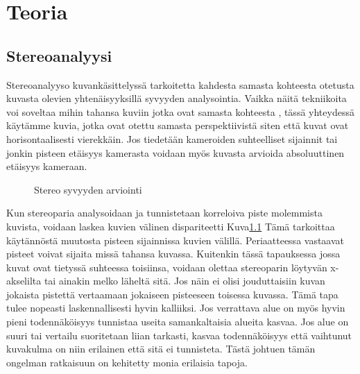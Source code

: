 \chapter{Teoria}%
\label{ch:teoria}

\section{Stereoanalyysi}

Stereoanalyyso kuvankäsittelyssä tarkoitetta kahdesta samasta kohteesta otetusta kuvasta olevien yhtenäisyyksillä syvyyden analysointia.
Vaikka näitä tekniikoita voi soveltaa mihin tahansa kuviin jotka ovat samasta kohteesta \cite{SumiYasushi20023ORi},
tässä yhteydessä käytämme kuvia,
jotka ovat otettu samasta perspektiivistä siten että kuvat ovat horisontaalisesti vierekkäin.
Jos tiedetään kameroiden suhteelliset sijainnit tai jonkin pisteen etäisyys kamerasta voidaan myös kuvasta arvioida absoluuttinen etäisyys kameraan. 

\begin{figure}[h]
\centering
{}
\caption{Stereo syvyyden arviointi}
\label{fig:stereo}
\end{figure}
    
Kun stereoparia analysoidaan ja tunnistetaan korreloiva piste molemmista kuvista,
voidaan laskea kuvien välinen dispariteetti Kuva\ref{fig:stereo}
Tämä tarkoittaa käytännöstä muutosta pisteen sijainnissa kuvien välillä.
Periaatteessa vastaavat pisteet voivat sijaita missä tahansa kuvassa.
Kuitenkin tässä tapauksessa jossa kuvat ovat tietyssä suhteessa toisiinsa,
voidaan olettaa stereoparin löytyvän x-akselilta tai ainakin melko läheltä sitä.
Jos näin ei olisi jouduttaisiin kuvan jokaista pistettä vertaamaan jokaiseen pisteeseen toisessa kuvassa.
Tämä tapa tulee nopeasti laskennallisesti hyvin kalliiksi.
Jos verrattava alue on myös hyvin pieni todennäköisyys tunnistaa useita samankaltaisia alueita kasvaa.
Jos alue on suuri tai vertailu suoritetaan liian tarkasti,
kasvaa todennäköisyys että vaihtunut kuvakulma on niin erilainen että sitä ei tunnisteta.
Tästä johtuen tämän ongelman ratkaisuun on kehitetty monia erilaisia tapoja.


